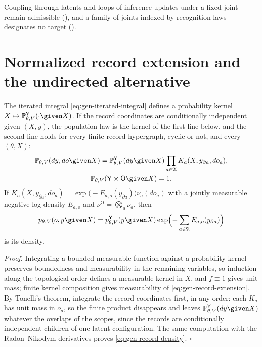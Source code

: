Coupling through latents and loops of inference updates under a fixed joint remain admissible
(), and a family of joints indexed by recognition laws designates no
target ().

\section{Normalized record extension and the undirected alternative}
\label{sec:gen-normalization}
\label{sec:gen-undirected}

The iterated integral \eqref{eq:gen-iterated-integral} defines a probability kernel
$X\mapsto\mathbb P_{\theta,V}^{\mathsf Y}(\cdot\given X)$. If the record coordinates are conditionally
independent given $(X,y)$, the population law is the kernel of the first line below, and the second
line holds for every finite record hypergraph, cyclic or not, and every $(\theta,X)$:
\begin{gather}
\mathbb P_{\theta,V}(dy,do\given X)
=\mathbb P_{\theta,V}^{\mathsf Y}(dy\given X)\prod_{a\in\mathfrak A}K_a(X,y_{\partial a},do_a),
\label{eq:gen-record-extension}\\
\mathbb P_{\theta,V}(\mathsf Y\times\mathsf O\given X)=1.
\label{eq:gen-normalization}
\end{gather}
If $K_a(X,y_{\partial a},do_a)=\exp\bigl(-E_{a,o}(y_{\partial a})\bigr)\nu_a(do_a)$ with a jointly measurable
negative log density $E_{a,o}$ and $\nu^{\mathsf O}=\bigotimes_{a}\nu_a$, then
\begin{equation}
p_{\theta,V}(o,y\given X)
=p_{\theta,V}^{\mathsf Y}(y\given X)\exp\Bigl(-\sum_{a\in\mathfrak A}E_{a,o}(y_{\partial a})\Bigr)
\label{eq:gen-record-density}
\end{equation}
is its density. 

\noindent\emph{Proof.}
Integrating a bounded measurable function against a probability kernel preserves boundedness and
measurability in the remaining variables, so induction along the topological order defines a measurable
kernel in $X$, and $f\equiv1$ gives unit mass; finite kernel composition gives measurability of
\eqref{eq:gen-record-extension}. By Tonelli's theorem, integrate the record coordinates first, in any
order: each $K_a$ has unit mass in $o_a$, so the finite product disappears and leaves
$\mathbb P_{\theta,V}^{\mathsf Y}(dy\given X)$ whatever the overlaps of the scopes, since the records are
conditionally independent children of one latent configuration. The same computation with the
Radon--Nikodym derivatives proves \eqref{eq:gen-record-density}. \hfill$\square$

